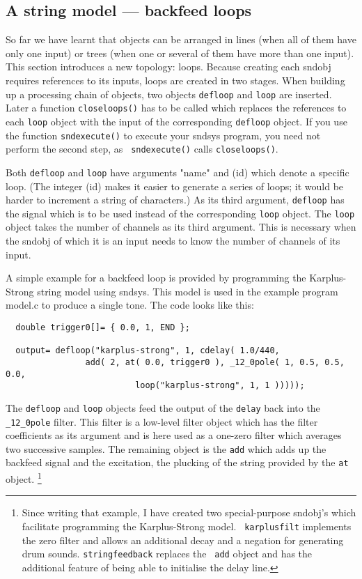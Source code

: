 \documentclass{article}
\def\s{{\sc sndsys} }
\def\sn{{\sc sndsys}}
\def\bv{\begin{verbatim}}
\begin{document}
\subsection{A string model --- backfeed loops}

So far we have learnt that objects can be arranged in lines (when all of them
have only one input) or trees (when one or several of them have more than one
input).  This section introduces a new topology: loops.  Because creating each
sndobj requires references to its inputs, loops are created in two stages.
When building up a processing chain of objects, two objects {\tt defloop} and
{\tt loop} are inserted.  Later a function {\tt closeloops()} has to be called
which replaces the references to each {\tt loop} object with the input of the
corresponding {\tt defloop} object.  If you use the function {\tt sndexecute()}
to execute your \s program, you need not perform the second step, as {\tt
sndexecute()} calls {\tt closeloops()}.

Both {\tt defloop} and {\tt loop} have arguments "name" and (id) which
denote a specific loop.  (The integer (id) makes it easier to generate a series
of loops; it would be harder to increment a string of characters.)  As its
third argument, {\tt defloop} has the signal which is to be used instead of the
corresponding {\tt loop} object.  The {\tt loop} object takes the number of
channels as its third argument.  This is necessary when the sndobj of which it
is an input needs to know the number of channels of its input.

A simple example for a backfeed loop is provided by programming the
Karplus-Strong string model using \sn.  This model is used in the example
program model.c to produce a single tone.  The code looks like this:

\bv
  double trigger0[]= { 0.0, 1, END };

  output= defloop("karplus-strong", 1, cdelay( 1.0/440, 
                add( 2, at( 0.0, trigger0 ), _12_0pole( 1, 0.5, 0.5, 0.0, 
		                  loop("karplus-strong", 1, 1 )))));
\end{verbatim}

The {\tt defloop} and {\tt loop} objects feed the output of the {\tt delay}
back into the {\tt \_12\_0pole} filter.  This filter is a low-level filter
object which has the filter coefficients as its argument and is here used as a
one-zero filter which averages two successive samples.  The remaining object is
the {\tt add} which adds up the backfeed signal and the excitation, the
plucking of the string provided by the {\tt at} object.%
%
\footnote{Since writing that example, I have created two special-purpose
sndobj's which facilitate programming the Karplus-Strong model.  {\tt
karplusfilt} implements the zero filter and allows an additional decay and a
negation for generating drum sounds.  {\tt stringfeedback} replaces the {\tt
add} object and has the additional feature of being able to initialise the
delay line.}
\end{document}
